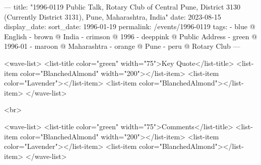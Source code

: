 ---
title: "1996-0119 Public Talk, Rotary Club of Central Pune, District 3130 (Currently District 3131), Pune, Maharashtra, India"
date: 2023-08-15
display_date: 
sort_date: 1996-01-19
permalink: /events/1996-0119
tags:
  - blue @ English
  - brown @ India
  - crimson @ 1996
  - deeppink @ Public Address
  - green @ 1996-01
  - maroon @ Maharashtra
  - orange @ Pune
  - peru @ Rotary Club
---

<wave-list>
  <list-title color="green" width="75">Key Quote</list-title>
  <list-item color="BlanchedAlmond"  width="200"></list-item>
  <list-item color="Lavender"></list-item>
  <list-item color="BlanchedAlmond"></list-item>
</wave-list>

<br>

<wave-list>
  <list-title color="green" width="75">Comments</list-title>
  <list-item color="BlanchedAlmond"  width="200"></list-item>
  <list-item color="Lavender"></list-item>
  <list-item color="BlanchedAlmond"></list-item>
</wave-list>